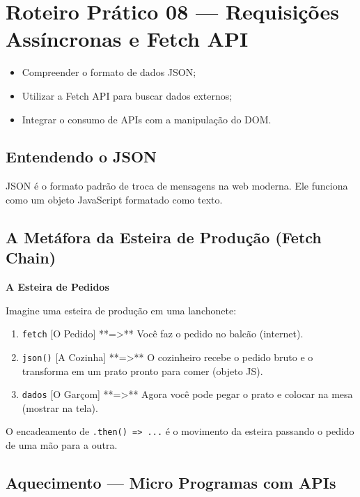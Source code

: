 \documentclass[12pt,a4paper]{article}
\begin{document}
\newpage

\section{Roteiro Prático 08 — Requisições Assíncronas e Fetch API}

\begin{boxObjetivos}
\begin{itemize}
    \item Compreender o formato de dados JSON;
    \item Utilizar a Fetch API para buscar dados externos;
    \item Integrar o consumo de APIs com a manipulação do DOM.
\end{itemize}
\end{boxObjetivos}

\subsection{Entendendo o JSON}
JSON é o formato padrão de troca de mensagens na web moderna. Ele funciona como um objeto JavaScript formatado como texto.

\subsection{A Metáfora da Esteira de Produção (Fetch Chain)}

\begin{boxDica}
\textbf{A Esteira de Pedidos}

Imagine uma esteira de produção em uma lanchonete:
\begin{enumerate}
    \item \texttt{fetch} [O Pedido] **=>** Você faz o pedido no balcão (internet).
    \item \texttt{json()} [A Cozinha] **=>** O cozinheiro recebe o pedido bruto e o transforma em um prato pronto para comer (objeto JS).
    \item \texttt{dados} [O Garçom] **=>** Agora você pode pegar o prato e colocar na mesa (mostrar na tela).
\end{enumerate}
O encadeamento de \texttt{.then() => ...} é o movimento da esteira passando o pedido de uma mão para a outra.
\end{boxDica}

\subsection{Aquecimento — Micro Programas com APIs}
\end{document}
